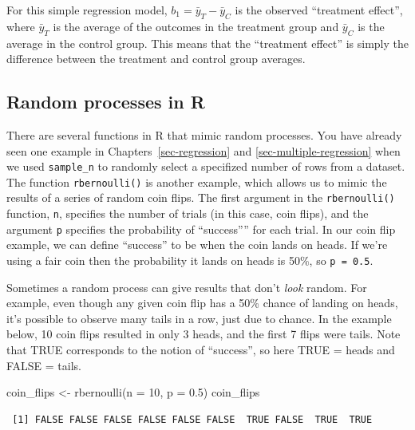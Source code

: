 \documentclass[
  letterpaper,
  DIV=11,
  numbers=noendperiod]{scrreprt}
\newenvironment{Shaded}{\begin{snugshade}}{\end{snugshade}}
\newcommand{\AttributeTok}[1]{\textcolor[rgb]{0.40,0.45,0.13}{#1}}
\newcommand{\DecValTok}[1]{\textcolor[rgb]{0.68,0.00,0.00}{#1}}
\newcommand{\FloatTok}[1]{\textcolor[rgb]{0.68,0.00,0.00}{#1}}
\newcommand{\FunctionTok}[1]{\textcolor[rgb]{0.28,0.35,0.67}{#1}}
\newcommand{\NormalTok}[1]{\textcolor[rgb]{0.00,0.23,0.31}{#1}}
\newcommand{\OtherTok}[1]{\textcolor[rgb]{0.00,0.23,0.31}{#1}}
\theoremstyle{definition}
\theoremstyle{remark}
\begin{document}
For this simple regression model, \(b_1 = \bar{y}_T - \bar{y}_C\) is the
observed ``treatment effect'', where \(\bar{y}_T\) is the average of the
outcomes in the treatment group and \(\bar{y}_C\) is the average in the
control group. This means that the ``treatment effect'' is simply the
difference between the treatment and control group averages.

\hypertarget{random-processes-in-r}{%
\subsection{Random processes in R}\label{random-processes-in-r}}

There are several functions in R that mimic random processes. You have
already seen one example in Chapters~\ref{sec-regression} and
\ref{sec-multiple-regression} when we used \texttt{sample\_n} to
randomly select a specifized number of rows from a dataset. The function
\texttt{rbernoulli()} is another example, which allows us to mimic the
results of a series of random coin flips. The first argument in the
\texttt{rbernoulli()} function, \texttt{n}, specifies the number of
trials (in this case, coin flips), and the argument \texttt{p} specifies
the probability of ``success'''' for each trial. In our coin flip
example, we can define ``success'' to be when the coin lands on heads.
If we're using a fair coin then the probability it lands on heads is
50\%, so \texttt{p\ =\ 0.5}.

Sometimes a random process can give results that don't \emph{look}
random. For example, even though any given coin flip has a 50\% chance
of landing on heads, it's possible to observe many tails in a row, just
due to chance. In the example below, 10 coin flips resulted in only 3
heads, and the first 7 flips were tails. Note that TRUE corresponds to
the notion of ``success'', so here TRUE = heads and FALSE = tails.

\begin{Shaded}
\begin{Highlighting}[]
\NormalTok{coin\_flips }\OtherTok{\textless{}{-}} \FunctionTok{rbernoulli}\NormalTok{(}\AttributeTok{n =} \DecValTok{10}\NormalTok{, }\AttributeTok{p =} \FloatTok{0.5}\NormalTok{)}
\NormalTok{coin\_flips}
\end{Highlighting}
\end{Shaded}

\begin{verbatim}
 [1] FALSE FALSE FALSE FALSE FALSE FALSE  TRUE FALSE  TRUE  TRUE
\end{verbatim}
\end{document}
